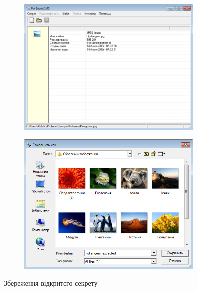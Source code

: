 \documentclass[
	a4paper,
	oneside,
	BCOR = 10mm,
	DIV = 12,
	12pt,
	headings = normal,
]{scrartcl}
\newlength{\gridunitwidth}
\begin{document}
		\begin{figure}[!htbp]
			\begin{subfigure}[b]{6 \gridunitwidth - 1em / (2-1)}
				\includegraphics[width = \columnwidth]{./assets/p13.png}
				\caption{}
				\label{subfig:secret-save-info}
			\end{subfigure}%
			\hspace{1em}%
			\begin{subfigure}[b]{6 \gridunitwidth - 1em / (2-1)}
				\includegraphics[width = \columnwidth]{./assets/p14.png}
				\caption{}
				\label{subfig:secret-save-select}
			\end{subfigure}
			\caption{Збереження відкритого секрету}
			\label{fig:secret-save}
		\end{figure}
\end{document}
